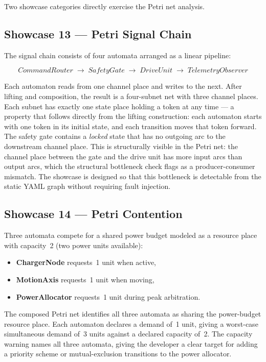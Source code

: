 Two showcase categories directly exercise the Petri net analysis.

\subsection{Showcase 13 --- Petri Signal Chain}

The signal chain consists of four automata arranged as a linear pipeline:

\[
  \textit{CommandRouter} \;\longrightarrow\; \textit{SafetyGate} \;\longrightarrow\; \textit{DriveUnit} \;\longrightarrow\; \textit{TelemetryObserver}
\]

Each automaton reads from one channel place and writes to the next. After lifting and composition, the result is a four-subnet net with three channel places. Each subnet has exactly one state place holding a token at any time --- a property that follows directly from the lifting construction: each automaton starts with one token in its initial state, and each transition moves that token forward. The safety gate contains a \textit{locked} state that has no outgoing arc to the downstream channel place. This is structurally visible in the Petri net: the channel place between the gate and the drive unit has more input arcs than output arcs, which the structural bottleneck check flags as a producer-consumer mismatch. The showcase is designed so that this bottleneck is detectable from the static YAML graph without requiring fault injection.

\subsection{Showcase 14 --- Petri Contention}

Three automata compete for a shared power budget modeled as a resource place with capacity~2 (two power units available):

\begin{itemize}
  \item \textbf{ChargerNode} requests~1 unit when active,
  \item \textbf{MotionAxis} requests~1 unit when moving,
  \item \textbf{PowerAllocator} requests~1 unit during peak arbitration.
\end{itemize}

The composed Petri net identifies all three automata as sharing the power-budget resource place. Each automaton declares a demand of~1 unit, giving a worst-case simultaneous demand of~3 units against a declared capacity of~2. The capacity warning names all three automata, giving the developer a clear target for adding a priority scheme or mutual-exclusion transitions to the power allocator.

